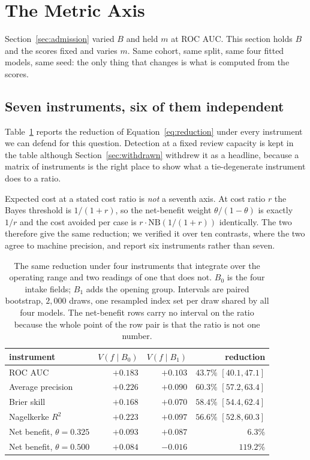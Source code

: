 \documentclass[preprint,12pt]{elsarticle}
\begin{document}
\section{The Metric Axis}
\label{sec:metric}

Section~\ref{sec:admission} varied $B$ and held $m$ at ROC AUC. This section
holds $B$ and the scores fixed and varies $m$. Same cohort, same split, same
four fitted models, same seed: the only thing that changes is what is
computed from the scores.

\subsection{Seven instruments, six of them independent}
Table~\ref{tab:instruments} reports the reduction of Equation~\ref{eq:reduction}
under every instrument we can defend for this question. Detection at a fixed
review capacity is kept in the table although Section~\ref{sec:withdrawn}
withdrew it as a headline, because a matrix of instruments is the right place
to show what a tie-degenerate instrument does to a ratio.

Expected cost at a stated cost ratio is \emph{not} a seventh axis. At cost
ratio $r$ the Bayes threshold is $1/(1+r)$, so the net-benefit weight
$\theta/(1-\theta)$ is exactly $1/r$ and the cost avoided per case is
$r \cdot \text{NB}(1/(1+r))$ identically. The two therefore give the same
reduction; we verified it over ten contrasts, where the two agree to machine
precision, and report six instruments rather than seven.

\begin{table}[t]
\centering
\small
\begin{tabular}{lrrr}
\toprule
instrument & $V(f \mid B_0)$ & $V(f \mid B_1)$ & reduction \\
\midrule
ROC AUC              & $+0.183$ & $+0.103$ & $43.7\%$ $[40.1,47.1]$ \\
Average precision    & $+0.226$ & $+0.090$ & $60.3\%$ $[57.2,63.4]$ \\
Brier skill          & $+0.168$ & $+0.070$ & $58.4\%$ $[54.4,62.4]$ \\
Nagelkerke $R^2$     & $+0.223$ & $+0.097$ & $56.6\%$ $[52.8,60.3]$ \\
\midrule
Net benefit, $\theta=0.325$ & $+0.093$ & $+0.087$ & $6.3\%$ \\
Net benefit, $\theta=0.500$ & $+0.084$ & $-0.016$ & $119.2\%$ \\
\bottomrule
\end{tabular}
\caption{The same reduction under four instruments that integrate over the
operating range and two readings of one that does not. $B_0$ is the four
intake fields; $B_1$ adds the opening group. Intervals are paired bootstrap,
$2{,}000$ draws, one resampled index set per draw shared by all four models.
The net-benefit rows carry no interval on the ratio because the whole point of
the row pair is that the ratio is not one number.}
\label{tab:instruments}
\end{table}
\end{document}

